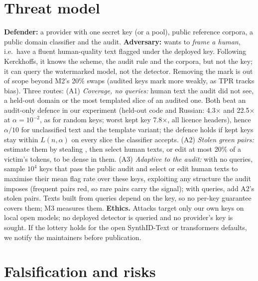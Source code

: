 \documentclass{article}
\theoremstyle{plain}
\begin{document}
\section{Threat model}
\label{sec:threat}

\textbf{Defender:} a provider with one secret key (or a pool), public reference corpora, a public domain classifier and the audit. \textbf{Adversary:} wants to \emph{frame a human}, i.e.\ have a fluent human-quality text flagged under the deployed key. Following Kerckhoffs, it knows the scheme, the audit rule and the corpora, but not the key; it can query the watermarked model, not the detector. Removing the mark is out of scope beyond M2's 20\% swaps (audited keys mark more weakly, as TPR tracks bias). Three routes:
(A1) \emph{Coverage, no queries:} human text the audit did not see, a held-out domain or the most templated slice of an audited one. Both beat an audit-only defence in our experiment (held-out code and Russian: 4.3$\times$ and 22.5$\times$ at $\alpha=10^{-2}$, as for random keys; worst kept key 7.8$\times$, all licence headers), hence $\alpha/10$ for unclassified text and the template variant; the defence holds if kept keys stay within $L(n,\alpha)$ on every slice the classifier accepts.
(A2) \emph{Stolen green pairs:} estimate them by stealing \citep{jovanovic2024stealing,sadasivan2025reliably}, then select human texts, or edit at most 20\% of a victim's tokens, to be dense in them.
(A3) \emph{Adaptive to the audit:} with no queries, sample $10^4$ keys that pass the public audit and select or edit human texts to maximise their mean flag rate over these keys, exploiting any structure the audit imposes (frequent pairs red, so rare pairs carry the signal); with queries, add A2's stolen pairs. Texts built from queries depend on the key, so no per-key guarantee covers them; M3 measures them.
\textbf{Ethics.} Attacks target only our own keys on local open models; no deployed detector is queried and no provider's key is sought. If the lottery holds for the open SynthID-Text or transformers defaults, we notify the maintainers before publication.

\section{Falsification and risks}
\label{sec:falsification}
\end{document}
